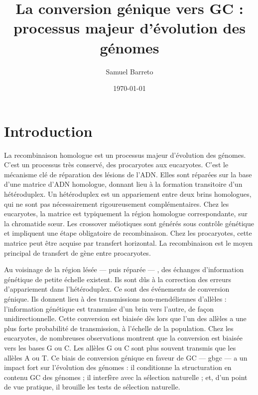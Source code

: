 \documentclass[11pt, oneside]{scrartcl}
\author{Samuel Barreto}
\date{\today}
\title{La conversion génique vers GC : processus majeur d'évolution des génomes}
\begin{document}


\section*{Introduction}
\label{sec:orgheadline1}

La recombinaison homologue est un processus majeur d'évolution des génomes.
C'est un processus très conservé, des procaryotes aux
eucaryotes\cite{cromie_recombination_2001}. C'est le mécanisme clé de réparation
des lésions de l'ADN. Elles sont réparées sur la base d'une matrice d'ADN
homologue, donnant lieu à la formation transitoire d'un hétéroduplex. Un
hétéroduplex est un appariement entre deux brins homologues, qui ne sont pas
nécessairement rigoureusement complémentaires. Chez les eucaryotes, la matrice
est typiquement la région homologue correspondante, sur la chromatide sœur. Les
crossover méiotiques sont générés sous contrôle génétique et impliquent une
étape obligatoire de recombinaison\cite{mancera_high-resolution_2008}. Chez les
procaryotes, cette matrice peut être acquise par transfert horizontal. La
recombinaison est le moyen principal de transfert de gène entre procaryotes.

Au voisinage de la région lésée --- puis réparée --- , des échanges
d'information génétique de petite échelle existent\cite{duret_biased_2009}. Ils
sont dûs à la correction des erreurs d'appariement dans l'hétéroduplex. Ce sont
des événements de conversion génique. Ils donnent lieu à des transmissions
non-mendéliennes d'allèles : l'information génétique est transmise d'un brin
vers l'autre, de façon unidirectionnelle. Cette conversion est biaisée dès lors
que l'un des allèles a une plus forte probabilité de transmission, à l'échelle
de la population. Chez les eucaryotes, de nombreuses observations montrent que
la conversion est biaisée vers les bases G ou
C\cite{pessia_evidence_2012,mancera_high-resolution_2008,duret_impact_2008}. Les
allèles G ou C sont plus souvent transmis que les allèles A ou T. Ce biais de
conversion génique en faveur de GC --- \ac{gbgc} --- a un impact fort sur
l'évolution des génomes : il conditionne la structuration en contenu GC des
génomes\cite{duret_impact_2008} ; il interfère avec la sélection
naturelle\cite{galtier_gc-biased_2009} ; et, d'un point de vue pratique, il
brouille les tests de sélection naturelle\cite{ratnakumar_detecting_2010}.
\end{document}
